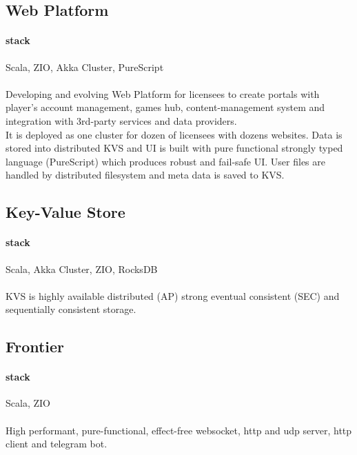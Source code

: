 \subsection{Web Platform}
\paragraph{stack} Scala, ZIO, Akka Cluster, PureScript
\paragraph{}
Developing and evolving Web Platform for licensees to create portals with player's account management, games hub, content-management system and integration with 3rd-party services and data providers.\\
It is deployed as one cluster for dozen of licensees with dozens websites. Data is stored into distributed KVS and UI is built with pure functional strongly typed language (PureScript) which produces robust and fail-safe UI. User files are handled by distributed filesystem and meta data is saved to KVS.

\subsection{Key-Value Store}
\paragraph{stack} Scala, Akka Cluster, ZIO, RocksDB
\paragraph{}
KVS is highly available distributed (AP) strong eventual consistent (SEC) and sequentially consistent storage.

\subsection{Frontier}
\paragraph{stack} Scala, ZIO
\paragraph{}
High performant, pure-functional, effect-free websocket, http and udp server, http client and telegram bot.

